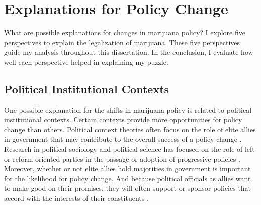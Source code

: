 \section{Explanations for Policy Change}

What are possible explanations for changes in marijuana policy? I explore five perspectives to explain the legalization of marijuana. These five perspectives guide my analysis throughout this dissertation. In the conclusion, I evaluate how well each perspective helped in explaining my puzzle.







\subsection{Political Institutional Contexts}

One possible explanation for the shifts in marijuana policy is related to political institutional contexts. Certain contexts provide more opportunities for policy change than others. Political context theories often focus on the role of elite allies in government that may contribute to the overall success of a policy change \citep{amenta_et_al_1994,amenta_2006}. Research in political sociology and political science has focused on the role of left- or reform-oriented parties in the passage or adoption of progressive policies \citep{amenta_and_elliott_2019,amenta_et_al_2005,korpi_1983}. Moreover, whether or not elite allies hold majorities in government is important for the likelihood for policy change\citep{ansolabehere_and_snyder2006,winters_1976,abramowitz_1983,campagna_and_grofman_1990}. And because political officials as allies want to make good on their promises, they will often support or sponsor policies that accord with the interests of their constituents \citep{page_and_shapiro_1983,mayhew_1974,downs_1957,stimson_et_al_1995}. 

